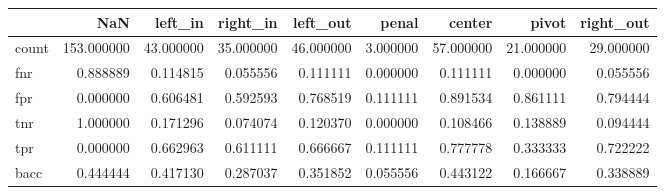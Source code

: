 \begin{tabular}{lrrrrrrrr}
\toprule
{} &         NaN &    left\_in &   right\_in &   left\_out &     penal &     center &      pivot &  right\_out \\
\midrule
count &  153.000000 &  43.000000 &  35.000000 &  46.000000 &  3.000000 &  57.000000 &  21.000000 &  29.000000 \\
fnr   &    0.888889 &   0.114815 &   0.055556 &   0.111111 &  0.000000 &   0.111111 &   0.000000 &   0.055556 \\
fpr   &    0.000000 &   0.606481 &   0.592593 &   0.768519 &  0.111111 &   0.891534 &   0.861111 &   0.794444 \\
tnr   &    1.000000 &   0.171296 &   0.074074 &   0.120370 &  0.000000 &   0.108466 &   0.138889 &   0.094444 \\
tpr   &    0.000000 &   0.662963 &   0.611111 &   0.666667 &  0.111111 &   0.777778 &   0.333333 &   0.722222 \\
bacc  &    0.444444 &   0.417130 &   0.287037 &   0.351852 &  0.055556 &   0.443122 &   0.166667 &   0.338889 \\
\bottomrule
\end{tabular}
